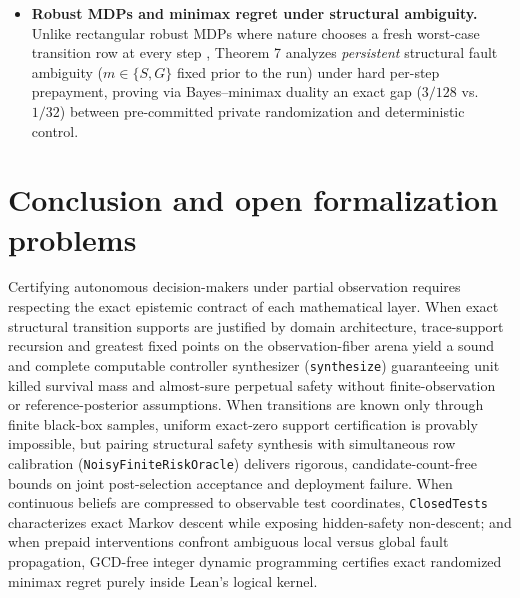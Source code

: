 \documentclass[11pt,a4paper]{article}
\begin{document}
\begin{itemize}
  and adaptive bandit/MDP concentration
  \citep{kearnsSingh2002, strehl2009, abbasiYadkori2011} by proving that
  simultaneous microscopic row calibration controls empirical
  lumpability defects across arbitrary finite families of candidate
  observation maps without candidate-count union bounds---using exact
  total variation rather than kernel maximum mean discrepancy
  \citep{gretton2012}, which cannot bound indicator safety events
  without additional regularity.
\item
  \textbf{Robust MDPs and minimax regret under structural ambiguity.}
  Unlike rectangular robust MDPs where nature chooses a fresh worst-case
  transition row at every step \citep{nilimElGhaoui2005, wiesemann2013},
  Theorem 7 analyzes \emph{persistent} structural fault ambiguity
  (\(m \in \{S, G\}\) fixed prior to the run) under hard per-step
  prepayment, proving via Bayes--minimax duality
  \citep{vonNeumann1928, wald1950, savage1951} an exact gap (\(3/128\)
  vs.~\(1/32\)) between pre-committed private randomization and
  deterministic control.
\end{itemize}

\section{Conclusion and open formalization
problems}\label{conclusion-and-open-formalization-problems}

Certifying autonomous decision-makers under partial observation requires
respecting the exact epistemic contract of each mathematical layer. When
exact structural transition supports are justified by domain
architecture, trace-support recursion and greatest fixed points on the
observation-fiber arena yield a sound and complete computable controller
synthesizer (\texttt{synthesize}) guaranteeing unit killed survival mass
and almost-sure perpetual safety without finite-observation or
reference-posterior assumptions. When transitions are known only through
finite black-box samples, uniform exact-zero support certification is
provably impossible, but pairing structural safety synthesis with
simultaneous row calibration (\texttt{NoisyFiniteRiskOracle}) delivers
rigorous, candidate-count-free bounds on joint post-selection acceptance
and deployment failure. When continuous beliefs are compressed to
observable test coordinates, \texttt{ClosedTests} characterizes exact
Markov descent while exposing hidden-safety non-descent; and when
prepaid interventions confront ambiguous local versus global fault
propagation, GCD-free integer dynamic programming certifies exact
randomized minimax regret purely inside Lean's logical kernel.
\end{document}
